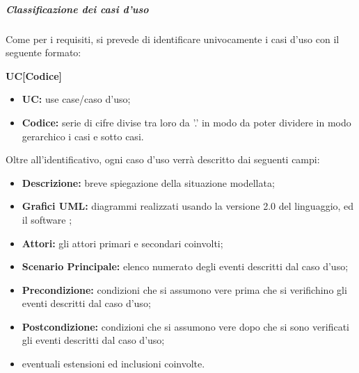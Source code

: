 \documentclass[]{article}
\begin{document}
						\subparagraph{Classificazione dei casi d'uso} %
						Come per i requisiti, si prevede di identificare univocamente i casi d'uso con il seguente formato:
						\begin{center}
							\textbf{UC[Codice]}
						\end{center}
						\begin{itemize}
							\item \textbf{UC:} use case/caso d'uso;
							\item \textbf{Codice:} serie di cifre divise tra loro da ’.’ in modo da poter dividere in modo gerarchico i casi e sotto casi.
						\end{itemize}
						Oltre all'identificativo, ogni caso d'uso verrà descritto dai seguenti campi:
						\begin{itemize}
							\item \textbf{Descrizione:} breve spiegazione della situazione modellata;
							\item \textbf{Grafici UML:} diagrammi realizzati usando la versione 2.0 del linguaggio, ed il software ;
							\item \textbf{Attori:} gli attori primari e secondari coinvolti;
							\item \textbf{Scenario Principale:} elenco numerato degli eventi descritti dal caso d'uso;
							\item \textbf{Precondizione:} condizioni che si assumono vere prima che si verifichino gli eventi descritti dal caso d'uso;
							\item \textbf{Postcondizione:} condizioni che si assumono vere dopo che si sono verificati gli eventi descritti dal caso d'uso;
							\item eventuali estensioni ed inclusioni coinvolte.
						\end{itemize}
					
\end{document}
